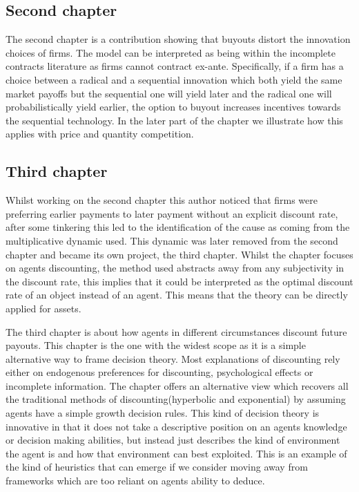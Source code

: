 \documentclass[12pt]{report}
\numberwithin{equation}{section}
\begin{document}
\subsection{Second chapter}

The second chapter is a contribution showing that buyouts distort the innovation choices of firms. The model can be interpreted as being within the incomplete contracts literature as firms cannot contract ex-ante. Specifically, if a firm has a choice between a radical and a sequential innovation which both yield the same market payoffs but the sequential one will yield later and the radical one will probabilistically yield earlier, the option to buyout increases incentives towards the sequential technology. In the later part of the chapter we illustrate how this applies with price and quantity competition.

 \subsection{Third chapter}

Whilst working on the second chapter this author noticed that firms were preferring earlier payments to later payment without an explicit discount rate, after some tinkering this led to the identification of the cause as coming from the multiplicative dynamic used. This dynamic was later removed from the second chapter and became its own project, the third chapter. Whilst the chapter focuses on agents discounting, the method used abstracts away from any subjectivity in the discount rate, this implies that it could be interpreted as the optimal discount rate of an object instead of an agent. This means that the theory can be directly applied for assets.  

The third chapter is about how agents in different circumstances discount future payouts. This chapter is the one with the widest scope as it is a simple alternative way to frame decision theory. Most explanations of discounting rely either on endogenous preferences for discounting, psychological effects or incomplete information. The chapter offers an alternative view which recovers all the traditional methods of discounting(hyperbolic and exponential) by assuming agents have a simple growth decision rules. This kind of decision theory is innovative in that it does not take a descriptive position on an agents knowledge or decision making abilities, but instead just describes the kind of environment the agent is and how that environment can best exploited. This is an example of the kind of heuristics that can emerge if we consider moving away from frameworks which are too reliant on agents ability to deduce.
\end{document}
